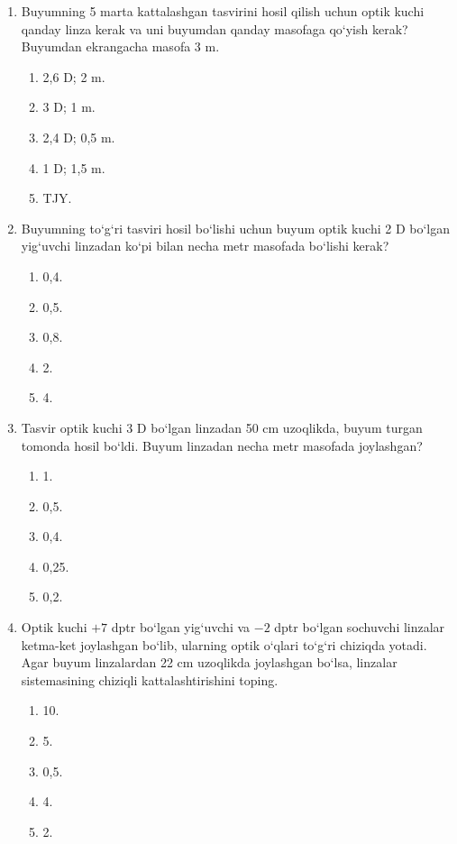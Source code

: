 \begin{enumerate}
\item Buyumning 5 marta kattalashgan tasvirini hosil qilish uchun optik kuchi qanday linza kerak va uni buyumdan qanday masofaga qo‘yish kerak? Buyumdan ekrangacha masofa 3 m.
\begin{enumerate}[label=\Alph*)]
\item 2,6 D; 2 m.
\item 3 D; 1 m.
\item 2,4 D; 0,5 m.
\item 1 D; 1,5 m.
\item TJY.
\end{enumerate}

\item Buyumning to‘g‘ri tasviri hosil bo‘lishi uchun buyum optik kuchi 2 D bo‘lgan yig‘uvchi linzadan ko‘pi bilan necha metr masofada bo‘lishi kerak?
\begin{enumerate}[label=\Alph*)]
\item 0,4.
\item 0,5.
\item 0,8.
\item 2.
\item 4.
\end{enumerate}

\item Tasvir optik kuchi 3 D bo‘lgan linzadan 50 cm uzoqlikda, buyum turgan tomonda hosil bo‘ldi. Buyum linzadan necha metr masofada joylashgan?
\begin{enumerate}[label=\Alph*)]
\item 1.
\item 0,5.
\item 0,4.
\item 0,25.
\item 0,2.
\end{enumerate}

\item Optik kuchi $+7$ dptr bo‘lgan yig‘uvchi va $-2$ dptr bo‘lgan sochuvchi linzalar ketma-ket joylashgan bo‘lib, ularning optik o‘qlari to‘g‘ri chiziqda yotadi. Agar buyum linzalardan 22 cm uzoqlikda joylashgan bo‘lsa, linzalar sistemasining chiziqli kattalashtirishini toping.
\begin{enumerate}[label=\Alph*)]
\item 10.
\item 5.
\item 0,5.
\item 4.
\item 2.
\end{enumerate}


\end{enumerate}
